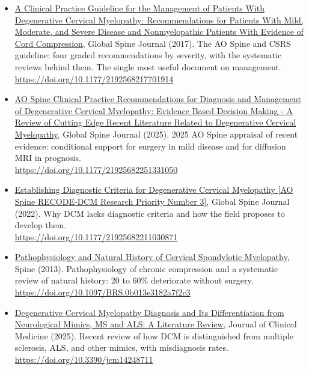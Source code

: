 \documentclass[11pt, letterpaper]{article}
\begin{document}
\begin{itemize}
        \\ {\small\url{https://doi.org/10.1371/journal.pmed.1004447}}
  \item \href{https://doi.org/10.1177/2192568217701914}{A Clinical Practice Guideline for the Management of Patients With Degenerative Cervical Myelopathy: Recommendations for Patients With Mild, Moderate, and Severe Disease and Nonmyelopathic Patients With Evidence of Cord Compression}, Global Spine Journal (2017). The AO Spine and CSRS guideline: four graded recommendations by severity, with the systematic reviews behind them. The single most useful document on management.
        \\ {\small\url{https://doi.org/10.1177/2192568217701914}}
  \item \href{https://doi.org/10.1177/21925682251331050}{AO Spine Clinical Practice Recommendations for Diagnosis and Management of Degenerative Cervical Myelopathy: Evidence Based Decision Making - A Review of Cutting Edge Recent Literature Related to Degenerative Cervical Myelopathy}, Global Spine Journal (2025). 2025 AO Spine appraisal of recent evidence: conditional support for surgery in mild disease and for diffusion MRI in prognosis.
        \\ {\small\url{https://doi.org/10.1177/21925682251331050}}
  \item \href{https://doi.org/10.1177/21925682211030871}{Establishing Diagnostic Criteria for Degenerative Cervical Myelopathy [AO Spine RECODE-DCM Research Priority Number 3]}, Global Spine Journal (2022). Why DCM lacks diagnostic criteria and how the field proposes to develop them.
        \\ {\small\url{https://doi.org/10.1177/21925682211030871}}
  \item \href{https://doi.org/10.1097/BRS.0b013e3182a7f2c3}{Pathophysiology and Natural History of Cervical Spondylotic Myelopathy}, Spine (2013). Pathophysiology of chronic compression and a systematic review of natural history: 20 to 60\% deteriorate without surgery.
        \\ {\small\url{https://doi.org/10.1097/BRS.0b013e3182a7f2c3}}
  \item \href{https://doi.org/10.3390/jcm14248711}{Degenerative Cervical Myelopathy Diagnosis and Its Differentiation from Neurological Mimics, MS and ALS: A Literature Review}, Journal of Clinical Medicine (2025). Recent review of how DCM is distinguished from multiple sclerosis, ALS, and other mimics, with misdiagnosis rates.
        \\ {\small\url{https://doi.org/10.3390/jcm14248711}}

\end{itemize}
\end{document}
